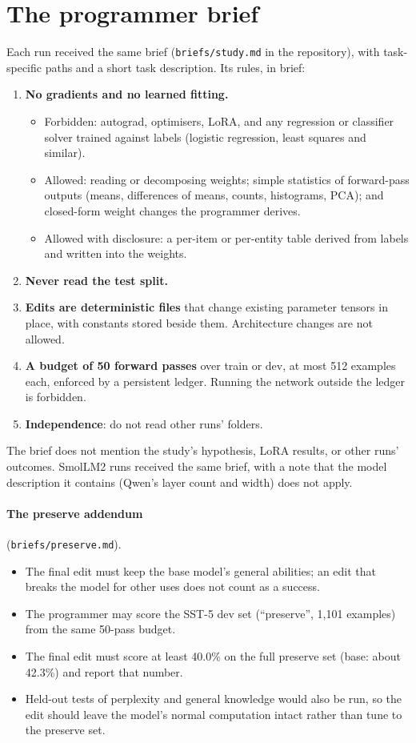 \section{The programmer brief}
\label{app:brief}
Each run received the same brief (\texttt{briefs/study.md} in the repository), with task-specific paths and a short task description. Its rules, in brief:
\begin{enumerate}
  \item \textbf{No gradients and no learned fitting.}
  \begin{itemize}
    \item Forbidden: autograd, optimisers, LoRA, and any regression or classifier solver trained against labels (logistic regression, least squares and similar).
    \item Allowed: reading or decomposing weights; simple statistics of forward-pass outputs (means, differences of means, counts, histograms, PCA); and closed-form weight changes the programmer derives.
    \item Allowed with disclosure: a per-item or per-entity table derived from labels and written into the weights.
  \end{itemize}
  \item \textbf{Never read the test split.}
  \item \textbf{Edits are deterministic files} that change existing parameter tensors in place, with constants stored beside them. Architecture changes are not allowed.
  \item \textbf{A budget of 50 forward passes} over train or dev, at most 512 examples each, enforced by a persistent ledger. Running the network outside the ledger is forbidden.
  \item \textbf{Independence}: do not read other runs' folders.
\end{enumerate}
The brief does not mention the study's hypothesis, LoRA results, or other runs' outcomes. SmolLM2 runs received the same brief, with a note that the model description it contains (Qwen's layer count and width) does not apply.

\paragraph{The preserve addendum} (\texttt{briefs/preserve.md}).
\begin{itemize}
  \item The final edit must keep the base model's general abilities; an edit that breaks the model for other uses does not count as a success.
  \item The programmer may score the SST-5 dev set (``preserve'', 1,101 examples) from the same 50-pass budget.
  \item The final edit must score at least 40.0\% on the full preserve set (base: about 42.3\%) and report that number.
  \item Held-out tests of perplexity and general knowledge would also be run, so the edit should leave the model's normal computation intact rather than tune to the preserve set.
\end{itemize}

